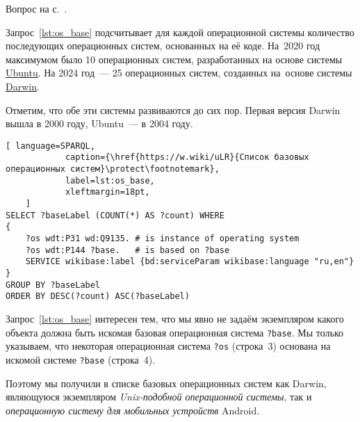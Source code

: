 \hfil{}\hfil%

\begin{task}
    \label{answer:os_base}
    \AnswerBackref Вопрос на с.~\pageref{lst:base_of_operating_systems}.

    Запрос~\ref{lst:os_base} подсчитывает для каждой операционной системы 
    количество последующих операционных систем, основанных на её коде. 
    На~2020 год максимумом было 10 операционных систем, 
    разработанных на основе системы \href{https://w.wiki/n8W}{Ubuntu}. 
    На 2024 год~--- 25 операционных систем, созданных на~основе системы \href{https://w.wiki/n8W}{Darwin}. 

    Отметим, что обе эти системы развиваются до сих пор. Первая версия Darwin вышла в 2000 году, Ubuntu~--- в 2004 году.

    \newpage
\begin{lstlisting}[ language=SPARQL, 
            caption={\href{https://w.wiki/uLR}{Список базовых операционных систем}\protect\footnotemark},
	        label=lst:os_base,
            xleftmargin=18pt, 
	]
SELECT ?baseLabel (COUNT(*) AS ?count) WHERE
{
	?os wdt:P31 wd:Q9135. # is instance of operating system
	?os wdt:P144 ?base.   # is based on ?base
	SERVICE wikibase:label {bd:serviceParam wikibase:language "ru,en"}
}
GROUP BY ?baseLabel
ORDER BY DESC(?count) ASC(?baseLabel)\end{lstlisting}

    Запрос~\ref{lst:os_base} интересен тем, что мы явно не задаём экземпляром какого объекта 
    должна быть искомая базовая операционная система \lstinline|?base|. 
    Мы только указываем, что некоторая операционная система \lstinline|?os| (строка~3) 
    основана на искомой системе \lstinline|?base| (строка~4). 

    Поэтому мы получили в списке базовых операционных систем как Darwin, 
    являющуюся экземпляром \emph{Unix-подобной операционной системы}, 
    так и \emph{операционную систему для мобильных устройств} Android.

\end{task}



